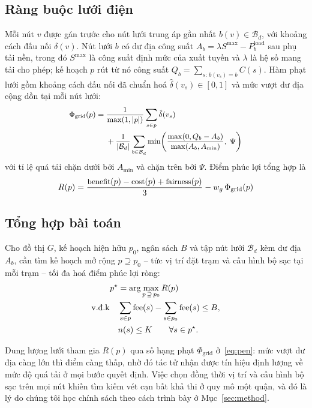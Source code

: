 \documentclass[10pt, conference, a4paper, compsocconf]{IEEEtran}
\begin{document}
\subsection{Ràng buộc lưới điện}

Mỗi nút $v$ được gán trước cho nút lưới trung áp gần nhất
$b(v)\in\mathcal{B}_d$, với khoảng cách đấu nối $\delta(v)$. Nút lưới $b$ có dư
địa công suất $A_b=\lambda S^{\max}-P_b^{\text{load}}$ sau phụ tải nền, trong
đó $S^{\max}$ là công suất định mức của xuất tuyến và $\lambda$ là hệ số mang
tải cho phép; kế hoạch $p$ rút từ nó công suất
$Q_b=\sum_{s:\,b(v_s)=b} C(s)$. Hàm phạt lưới gồm khoảng cách đấu nối đã chuẩn
hoá $\hat\delta(v_s)\in[0,1]$ và mức vượt dư địa cộng dồn tại mỗi nút lưới:
\begin{equation}\small
\label{eq:pen}
\begin{aligned}
\Phi_{\text{grid}}(p) = {} & \frac{1}{\max(1,|p|)}\sum_{s\in p}\hat\delta(v_s)\\
& + \frac{1}{|\mathcal{B}_d|}\sum_{b\in\mathcal{B}_d}\min\!\left(\frac{\max(0,Q_b-A_b)}{\max(A_b,A_{\min})},\;\Psi\right)
\end{aligned}
\end{equation}
với tỉ lệ quá tải chặn dưới bởi $A_{\min}$ và chặn trên bởi $\Psi$. Điểm phúc
lợi tổng hợp là
\begin{equation}\small
\label{eq:score}
R(p) = \frac{\text{benefit}(p) - \text{cost}(p) + \text{fairness}(p)}{3} - w_g\,\Phi_{\text{grid}}(p)
\end{equation}

\subsection{Tổng hợp bài toán}
\label{subsec:problem}

Cho đồ thị $G$, kế hoạch hiện hữu $p_0$, ngân sách $B$ và tập nút lưới
$\mathcal{B}_d$ kèm dư địa $A_b$, cần tìm kế hoạch mở rộng $p\supseteq p_0$ --
tức vị trí đặt trạm và cấu hình bộ sạc tại mỗi trạm -- tối đa hoá điểm phúc lợi
ròng:
\begin{align}\small
p^\star &= \arg\max_{p\,\supseteq\,p_0} R(p) \label{eq:objective}\\
\text{v.đ.k}\quad & \sum_{s\in p}\mathrm{fee}(s)-\sum_{s\in p_0}\mathrm{fee}(s) \le B, \label{eq:budget}\\
& n(s)\le K \qquad \forall s\in p^\star . \label{eq:cap}
\end{align}

Dung lượng lưới tham gia $R(p)$ qua số hạng phạt $\Phi_{\text{grid}}$
ở~\eqref{eq:pen}: mức vượt dư địa càng lớn thì điểm càng thấp, nhờ đó tác tử
nhận được tín hiệu định lượng về mức độ quá tải ở mọi bước quyết định. Việc
chọn đồng thời vị trí và cấu hình bộ sạc trên mọi nút khiến tìm kiếm vét cạn
bất khả thi ở quy mô một quận, và đó là lý do chúng tôi học chính sách theo
cách trình bày ở Mục~\ref{sec:method}.
\end{document}
